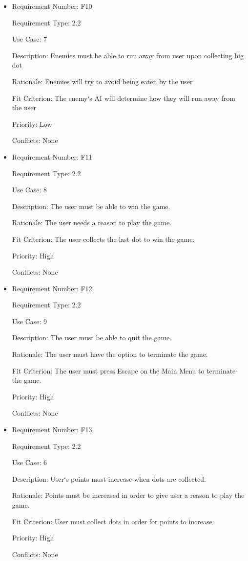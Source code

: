 \documentclass[12pt, titlepage]{article}
\begin{document}
\begin{itemize}
\item
Requirement Number: F10

Requirement Type: 2.2

Use Case: 7

Description: Enemies must be able to run away from user upon collecting big dot

Rationale: Enemies will try to avoid being eaten by the user

Fit Criterion: The enemy`s AI will determine how they will run away from the user

Priority: Low

Conflicts: None
\end{itemize}

\begin{itemize}
\item
Requirement Number: F11

Requirement Type: 2.2

Use Case: 8

Description: The user must be able to win the game.

Rationale: The user needs a reason to play the game.

Fit Criterion: The user collects the last dot to win the game.

Priority: High

Conflicts: None
\end{itemize}

\begin{itemize}
\item
Requirement Number: F12

Requirement Type: 2.2

Use Case: 9

Description: The user must be able to quit the game.

Rationale: The user must have the option to terminate the game.

Fit Criterion: The user must press Escape on the Main Menu to terminate the game.

Priority: High

Conflicts: None
\end{itemize}

\begin{itemize}
\item
Requirement Number: F13

Requirement Type: 2.2

Use Case: 6

Description: User`s points must increase when dots are collected.

Rationale: Points must be increased in order to give user a reason to play the game.

Fit Criterion: User must collect dots in order for points to increase.

Priority: High

Conflicts: None
\end{itemize}
\end{document}
